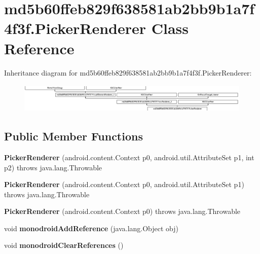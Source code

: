 \hypertarget{classmd5b60ffeb829f638581ab2bb9b1a7f4f3f_1_1PickerRenderer}{}\section{md5b60ffeb829f638581ab2bb9b1a7f4f3f.\+Picker\+Renderer Class Reference}
\label{classmd5b60ffeb829f638581ab2bb9b1a7f4f3f_1_1PickerRenderer}
Inheritance diagram for md5b60ffeb829f638581ab2bb9b1a7f4f3f.\+Picker\+Renderer\+:\begin{figure}[H]
\begin{center}
\leavevmode
\includegraphics[height=1.403509cm]{classmd5b60ffeb829f638581ab2bb9b1a7f4f3f_1_1PickerRenderer}
\end{center}
\end{figure}
\subsection*{Public Member Functions}
\begin{DoxyCompactItemize}
\item 
\mbox{\label{classmd5b60ffeb829f638581ab2bb9b1a7f4f3f_1_1PickerRenderer_a461011fae58fd61c16bddd9354a0e2ee}} 
{\bfseries Picker\+Renderer} (android.\+content.\+Context p0, android.\+util.\+Attribute\+Set p1, int p2)  throws java.\+lang.\+Throwable 	
\item 
\mbox{\label{classmd5b60ffeb829f638581ab2bb9b1a7f4f3f_1_1PickerRenderer_a9fd2bcb1d380420ff920cacf999ff555}} 
{\bfseries Picker\+Renderer} (android.\+content.\+Context p0, android.\+util.\+Attribute\+Set p1)  throws java.\+lang.\+Throwable 	
\item 
\mbox{\label{classmd5b60ffeb829f638581ab2bb9b1a7f4f3f_1_1PickerRenderer_a9880f6ec6bfd5158d950ca6e6f6a9bf9}} 
{\bfseries Picker\+Renderer} (android.\+content.\+Context p0)  throws java.\+lang.\+Throwable 	
\item 
\mbox{\label{classmd5b60ffeb829f638581ab2bb9b1a7f4f3f_1_1PickerRenderer_ac220cbf2703931a21301fff234bdcd51}} 
void {\bfseries monodroid\+Add\+Reference} (java.\+lang.\+Object obj)
\item 
\mbox{\label{classmd5b60ffeb829f638581ab2bb9b1a7f4f3f_1_1PickerRenderer_a1da45f3e35fc65d101c94408a81964f7}} 
void {\bfseries monodroid\+Clear\+References} ()
\end{DoxyCompactItemize}
